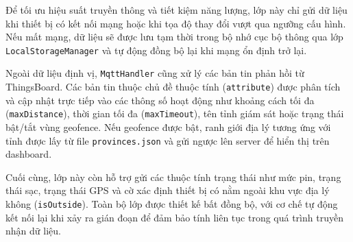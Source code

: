 \documentclass[../DoAn.tex]{subfiles}
\begin{document}
Để tối ưu hiệu suất truyền thông và tiết kiệm năng lượng, lớp này chỉ gửi dữ liệu khi thiết bị có kết nối mạng hoặc khi tọa độ thay đổi vượt qua ngưỡng cấu hình. Nếu mất mạng, dữ liệu sẽ được lưu tạm thời trong bộ nhớ cục bộ thông qua lớp \texttt{LocalStorageManager} và tự động đồng bộ lại khi mạng ổn định trở lại.

Ngoài dữ liệu định vị, \texttt{MqttHandler} cũng xử lý các bản tin phản hồi từ ThingsBoard. Các bản tin thuộc chủ đề thuộc tính (\texttt{attribute}) được phân tích và cập nhật trực tiếp vào các thông số hoạt động như khoảng cách tối đa (\texttt{maxDistance}), thời gian tối đa (\texttt{maxTimeout}), tên tỉnh giám sát hoặc trạng thái bật/tắt vùng geofence. Nếu geofence được bật, ranh giới địa lý tương ứng với tỉnh được lấy từ file \texttt{provinces.json} và gửi ngược lên server để hiển thị trên dashboard.

Cuối cùng, lớp này còn hỗ trợ gửi các thuộc tính trạng thái như mức pin, trạng thái sạc, trạng thái GPS và cờ xác định thiết bị có nằm ngoài khu vực địa lý không (\texttt{isOutside}). Toàn bộ lớp được thiết kế bất đồng bộ, với cơ chế tự động kết nối lại khi xảy ra gián đoạn để đảm bảo tính liên tục trong quá trình truyền nhận dữ liệu.
\end{document}
